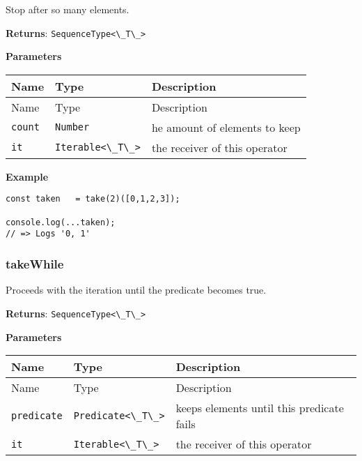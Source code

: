 Stop after so many elements.

\textbf{Returns}: \passthrough{\lstinline!SequenceType<\_T\_>!}

\textbf{Parameters}

\begin{longtable}[]{
  >{\raggedright\arraybackslash}p{}
  >{\raggedright\arraybackslash}p{}
  >{\raggedright\arraybackslash}p{}@{}}

\toprule\noalign{}
Name & Type & Description \\
\midrule\noalign{}
\endfirsthead
\toprule\noalign{}
Name & Type & Description \\
\midrule\noalign{}
\endhead
\bottomrule\noalign{}
\endlastfoot
\passthrough{\lstinline!count!} & \passthrough{\lstinline!Number!} & he
amount of elements to keep \\
\passthrough{\lstinline!it!} & \passthrough{\lstinline!Iterable<\_T\_>!}
& the receiver of this operator \\
\end{longtable}

\textbf{Example}

\begin{lstlisting}[label=e8ce9038-50f4-4af9-b2fb-5de4fd45e2ca]
const taken   = take(2)([0,1,2,3]);
                                   
console.log(...taken);
// => Logs '0, 1'
\end{lstlisting}

\hypertarget{00fcf74e-3b9e-4957-bbe5-f4ffcb3b6ae5}{%
\subsubsection{takeWhile}\label{00fcf74e-3b9e-4957-bbe5-f4ffcb3b6ae5}}

Proceeds with the iteration until the predicate becomes true.

\textbf{Returns}: \passthrough{\lstinline!SequenceType<\_T\_>!}

\textbf{Parameters}

\begin{longtable}[]{
  >{\raggedright\arraybackslash}p{}
  >{\raggedright\arraybackslash}p{}
  >{\raggedright\arraybackslash}p{}@{}}

\toprule\noalign{}
Name & Type & Description \\
\midrule\noalign{}
\endfirsthead
\toprule\noalign{}
Name & Type & Description \\
\midrule\noalign{}
\endhead
\bottomrule\noalign{}
\endlastfoot
\passthrough{\lstinline!predicate!} &
\passthrough{\lstinline!Predicate<\_T\_>!} & keeps elements until this
predicate fails \\
\passthrough{\lstinline!it!} & \passthrough{\lstinline!Iterable<\_T\_>!}
& the receiver of this operator \\
\end{longtable}

